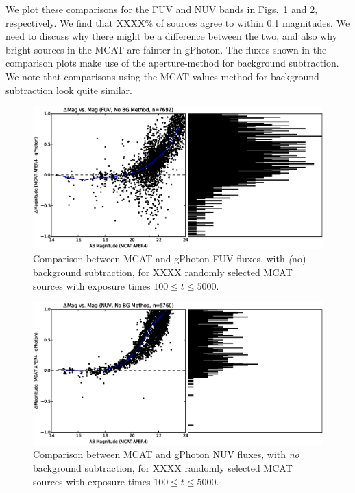 \documentclass[5p]{elsarticle}
\begin{document}
We plot these comparisons for the FUV and NUV bands in Figs.\ \ref{fuvrelphot} and \ref{nuvrelphot}, respectively.  We find that {\color{red}XXXX\%} of sources agree to within 0.1 magnitudes.  {\color{red}We need to discuss why there might be a difference between the two, and also why bright sources in the MCAT are fainter in gPhoton.}  The fluxes shown in the comparison plots make use of the aperture-method for background subtraction.  We note that comparisons using the MCAT-values-method for background subtraction look quite similar.

\begin{figure}
\includegraphics[scale=0.32]{FigRelPhotFUV-no_bg.eps}
\caption{Comparison between MCAT and gPhoton FUV fluxes, with \emph(no) background subtraction, for {\color{red}XXXX} randomly selected MCAT sources with exposure times $100 \leq t \leq 5000$. \label{fuvrelphot}}
\end{figure}

\begin{figure}
\includegraphics[scale=0.32]{FigRelPhotNUV-no_bg.eps}
\caption{Comparison between MCAT and gPhoton NUV fluxes, with \emph{no} background subtraction, for {\color{red}XXXX} randomly selected MCAT sources with exposure times $100 \leq t \leq 5000$. \label{nuvrelphot}}
\end{figure}
\end{document}
